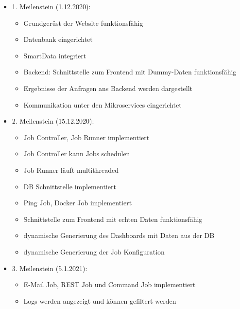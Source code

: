 \begin{itemize}
 \item 1. Meilenstein (1.12.2020):
 \begin{itemize}
  \item Grundgerüst der Website funktionsfähig
  \item Datenbank eingerichtet
  \item SmartData integriert
  \item Backend: Schnittstelle zum Frontend mit Dummy-Daten funktionsfähig
  \item Ergebnisse der Anfragen ans Backend werden dargestellt
  \item Kommunikation unter den Mikroservices eingerichtet
 \end{itemize}
 \item 2. Meilenstein (15.12.2020):
 \begin{itemize}
  \item Job Controller, Job Runner implementiert
  \item Job Controller kann Jobs schedulen
  \item Job Runner läuft multithreaded
  \item DB Schnittstelle implementiert
  \item Ping Job, Docker Job implementiert
  \item Schnittstelle zum Frontend mit echten Daten funktionsfähig
  \item dynamische Generierung des Dashboards mit Daten aus der DB
  \item dynamische Generierung der Job Konfiguration
 \end{itemize}
 \item 3. Meilenstein (5.1.2021):
 \begin{itemize}
  \item E-Mail Job, REST Job und Command Job implementiert
  \item Logs werden angezeigt und können gefiltert werden
 \end{itemize}
\end{itemize}